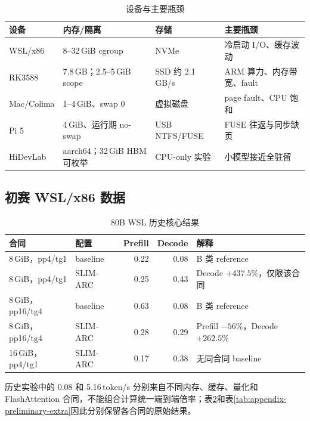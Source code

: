 \begin{table}[H]
  \centering
  \scriptsize
  \caption{设备与主要瓶颈}
  \label{tab:appendix-devices}
  \begin{tabular}{p{}p{}p{}p{}}
    \toprule
    设备 & 内存/隔离 & 存储 & 主要瓶颈 \\
    \midrule
    WSL/x86 & 8--32\,GiB cgroup & NVMe & 冷启动 I/O、缓存波动 \\
    RK3588 & 7.8\,GB；2.5--5\,GiB scope & SSD 约 2.1\,GB/s & ARM 算力、内存带宽、fault \\
    Mac/Colima & 1--4\,GiB、swap 0 & 虚拟磁盘 & page fault、CPU 饱和 \\
    Pi 5 & 4\,GiB、运行期 no-swap & USB NTFS/FUSE & FUSE 往返与同步缺页 \\
    HiDevLab & aarch64；32\,GiB HBM 可枚举 & CPU-only 实验 & 小模型接近全驻留 \\
    \bottomrule
  \end{tabular}
\end{table}

\subsection{初赛 WSL/x86 数据}

\begin{table}[H]
  \centering
  \scriptsize
  \caption{80B WSL 历史核心结果}
  \label{tab:appendix-wsl-core}
  \begin{tabular}{p{}p{}rrp{}}
    \toprule
    合同 & 配置 & Prefill & Decode & 解释 \\
    \midrule
    8\,GiB，pp4/tg1 & baseline & 0.22 & 0.08 & B 类 reference \\
    8\,GiB，pp4/tg1 & SLIM-ARC & 0.25 & 0.43 & Decode $+437.5\%$，仅限该合同 \\
    8\,GiB，pp16/tg4 & baseline & 0.63 & 0.08 & B 类 reference \\
    8\,GiB，pp16/tg4 & SLIM-ARC & 0.28 & 0.29 & Prefill $-56\%$，Decode $+262.5\%$ \\
    16\,GiB，pp4/tg1 & SLIM-ARC & 0.17 & 0.38 & 无同合同 baseline \\
    \bottomrule
  \end{tabular}
\end{table}

历史实验中的 0.08 和 5.16\,token/s 分别来自不同内存、缓存、量化和 FlashAttention 合同，不能组合计算统一端到端倍率；表\ref{tab:appendix-wsl-core}和表\ref{tab:appendix-preliminary-extra}因此分别保留各合同的原始结果。

